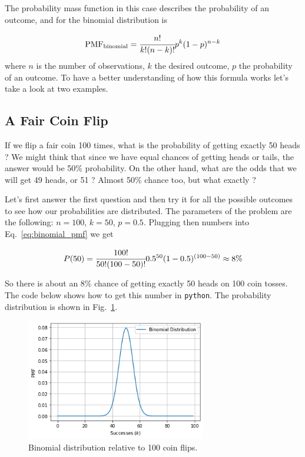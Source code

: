 The probability mass function in this case describes the probability of an outcome, and for the binomial distribution is

\begin{equation} \mathrm{PMF}_{\mathrm{binomial}} = \cfrac{n!}{k!(n-k)!}p^k (1-p)^{n-k}
\label{eq:binomial_pmf}
\end{equation}
where \(n\) is the number of observations, \(k\) the desired outcome, \(p\) the probability of an outcome. To have a better understanding of how this formula works let's take a look at two examples.

\subsection{A Fair Coin Flip}\label{a-fair-coin-flip}

If we flip a fair coin 100 times, what is the probability of getting exactly 50 heads ? 
We might think that since we have equal chances
of getting heads or tails, the answer would be 50\% probability. On the other hand, what are the odds that we will get 49 heads, or 51 ? Almost 50\% chance too, but what exactly ? 

Let's first answer the first question and then try it for all the possible outcomes to see how our probabilities are distributed. The parameters of the problem are the following: \(n = 100\), \(k = 50\), \(p = 0.5\). Plugging then numbers into Eq.~\ref{eq:binomial_pmf} we get

\begin{equation*}
P(50) = \cfrac{100!}{50!(100 - 50)!}0.5^{50}(1-0.5)^{(100-50)} \approx 8\%
\end{equation*}

So there is about an 8\% chance of getting exactly 50 heads on 100 coin tosses. The code below shows how to get this number in \texttt{python}. The probability distribution is shown in Fig.~\ref{fig:binomial_coin_flip}.


\begin{figure}[ht]
\centering
    \includegraphics[width=0.7\textwidth]{figures/binomial_2_0.png}
    \caption{Binomial distribution relative to 100 coin flips.}
    \label{fig:binomial_coin_flip}
\end{figure}
    
